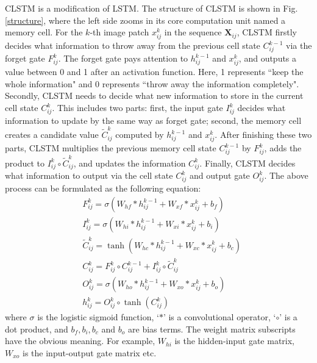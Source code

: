 \documentclass[12pt,onecolumn]{IEEEtran}
\begin{document}
\begin{spacing}{2}
CLSTM is a modification of LSTM. The structure of CLSTM is shown in Fig.$~$\ref{structure}, where the left side zooms in its core computation unit named a memory cell. For the $k$-th image patch ${x}^{k}_{ij}$ in the sequence $\mathbf{X}_{ij}$,
CLSTM firstly decides what information to throw away from the previous cell state ${C}^{k-1}_{ij}$ via the forget gate ${F}^{k}_{ij}$. The forget gate pays attention to ${h}^{k-1}_{ij}$ and ${x}^{k}_{ij}$, and outputs a value between 0 and 1 after an activation function. Here, 1 represents ``keep the whole information" and 0 represents ``throw away the information completely". Secondly, CLSTM needs to decide what new information to store in the current cell state ${C}^{k}_{ij}$. This includes two parts: first, the input gate ${I}^{k}_{ij}$ decides what information to update by the same way as forget gate; second, the memory cell creates a candidate value $\tilde{C}^{k}_{ij}$ computed by ${h}^{k-1}_{ij}$ and ${x}^{k}_{ij}$. After finishing these two parts, CLSTM multiplies the previous memory cell state ${C}^{k-1}_{ij}$ by ${F}^{k}_{ij}$, adds the product to ${I}^{k}_{ij}\circ\tilde{C}^{k}_{ij}$, and updates the information ${C}^{k}_{ij}$. Finally, CLSTM decides what information to output via the cell state ${C}^{k}_{ij}$ and output gate ${O}^{k}_{ij}$. The above process can be formulated as the following equation:
\begin{equation*}\label{CLSTM}
\begin{aligned}
  &{F}^{k}_{ij} = \sigma({W}_{hf}\ast{h}^{k-1}_{ij}+{W}_{xf}\ast{x}^{k}_{ij} + {b}_{f})\\
  &{I}^{k}_{ij} = \sigma({W}_{hi}\ast{h}^{k-1}_{ij}+{W}_{xi}\ast{x}^{k}_{ij} + {b}_{i})\\
  &\tilde{C}^{k}_{ij} = \tanh({W}_{hc}\ast{h}^{k-1}_{ij}+{W}_{xc}\ast{x}^{k}_{ij} + {b}_{c})\\
  &{C}^{k}_{ij} = {F}^{k}_{ij}\circ{C}^{k-1}_{ij} + {I}^{k}_{ij}\circ\tilde{C}^{k}_{ij}\\
  &{O}^{k}_{ij} = \sigma({W}_{ho}\ast{h}^{k-1}_{ij}+{W}_{xo}\ast{x}^{k}_{ij} + {b}_{o})\\
  &{h}^{k}_{ij} = {O}^{k}_{ij}\circ\tanh({C}^{k}_{ij})
\end{aligned}
\end{equation*}
where $\sigma$ is the logistic sigmoid function, `$\ast$' is a convolutional operator, `$\circ$' is a dot product, and ${b}_{f}, {b}_{i}, {b}_{c}$ and ${b}_{o}$ are bias terms. The weight matrix subscripts have the obvious meaning. For example, ${W}_{hi}$ is the hidden-input gate matrix, ${W}_{xo}$ is the input-output gate matrix etc.


\end{spacing}
\end{document}
